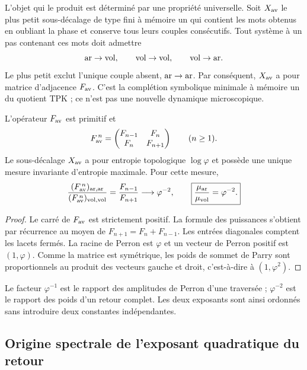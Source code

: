 L'objet qui le produit est déterminé par une propriété universelle.
Soit \(X_{\rm av}\) le plus petit sous-décalage de type fini à mémoire un qui
contient les mots obtenus en oubliant la phase et conserve tous leurs
couples consécutifs. Tout système à un pas contenant ces mots doit
admettre
\[
 {\rm ar}\to{\rm vol},\qquad
 {\rm vol}\to{\rm vol},\qquad
 {\rm vol}\to{\rm ar}.
\]
Le plus petit exclut l'unique couple absent, \({\rm ar}\to{\rm ar}\). Par
conséquent, \(X_{\rm av}\) a pour matrice d'adjacence \(F_{\rm av}\).
C'est la complétion symbolique minimale à mémoire un du quotient TPK ; ce
n'est pas une nouvelle dynamique microscopique.

\begin{theorem}
\label{p12-83-c16-s3:thm:ley-fibonacci-retornos-corta}
L'opérateur \(F_{\rm av}\) est primitif et
\[
 F_{\rm av}^{\,n}
 =\begin{pmatrix}F_{n-1}&F_n\\F_n&F_{n+1}\end{pmatrix}
 \qquad(n\geq1).
\]
Le sous-décalage \(X_{\rm av}\) a pour entropie topologique
\(\log\varphi\) et possède une unique mesure invariante d'entropie maximale. Pour
cette mesure,
\[
 \frac{(F_{\rm av}^{\,n})_{\rm ar,ar}}
 {(F_{\rm av}^{\,n})_{\rm vol,vol}}
 =\frac{F_{n-1}}{F_{n+1}}
 \longrightarrow\varphi^{-2},
 \qquad
 \boxed{\frac{\mu_{\rm ar}}{\mu_{\rm vol}}=\varphi^{-2}.}
\]
\end{theorem}

\begin{proof}
Le carré de \(F_{\rm av}\) est strictement positif. La formule des
puissances s'obtient par récurrence au moyen de
\(F_{n+1}=F_n+F_{n-1}\). Les entrées diagonales comptent les lacets fermés.
La racine de Perron est \(\varphi\) et un vecteur de Perron positif est
\((1,\varphi)\). Comme la matrice est symétrique, les poids de sommet de
Parry sont proportionnels au produit des vecteurs gauche et droit,
c'est-à-dire à \((1,\varphi^2)\).
\end{proof}

Le facteur \(\varphi^{-1}\) est le rapport des amplitudes de Perron d'une
traversée ; \(\varphi^{-2}\) est le rapport des poids d'un retour complet.
Les deux exposants sont ainsi ordonnés sans introduire deux constantes
indépendantes.

\subsection{Origine spectrale de l'exposant quadratique du retour}

